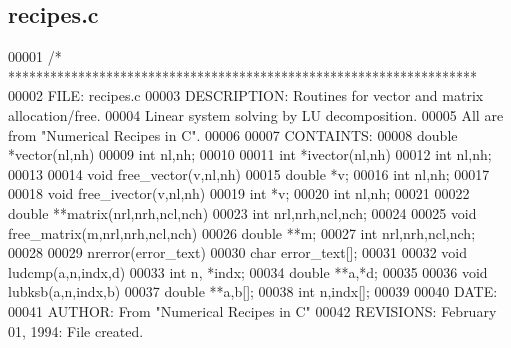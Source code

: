\subsection{recipes.\+c}
\label{recipes_8c_source}

\begin{DoxyCode}
00001 \textcolor{comment}{/* *******************************************************************}
00002 \textcolor{comment}{FILE:       recipes.c}
00003 \textcolor{comment}{DESCRIPTION:    Routines for vector and matrix allocation/free.}
00004 \textcolor{comment}{        Linear system solving by LU decomposition.}
00005 \textcolor{comment}{        All are from "Numerical Recipes in C".}
00006 \textcolor{comment}{}
00007 \textcolor{comment}{CONTAINTS:  }
00008 \textcolor{comment}{        double  *vector(nl,nh)}
00009 \textcolor{comment}{        int    nl,nh;}
00010 \textcolor{comment}{}
00011 \textcolor{comment}{        int  *ivector(nl,nh)}
00012 \textcolor{comment}{        int  nl,nh;}
00013 \textcolor{comment}{}
00014 \textcolor{comment}{        void free\_vector(v,nl,nh)}
00015 \textcolor{comment}{        double *v;}
00016 \textcolor{comment}{        int   nl,nh;}
00017 \textcolor{comment}{}
00018 \textcolor{comment}{        void free\_ivector(v,nl,nh)}
00019 \textcolor{comment}{        int *v;}
00020 \textcolor{comment}{        int   nl,nh;}
00021 \textcolor{comment}{}
00022 \textcolor{comment}{        double  **matrix(nrl,nrh,ncl,nch)}
00023 \textcolor{comment}{        int  nrl,nrh,ncl,nch;}
00024 \textcolor{comment}{}
00025 \textcolor{comment}{        void free\_matrix(m,nrl,nrh,ncl,nch)}
00026 \textcolor{comment}{        double **m;}
00027 \textcolor{comment}{        int   nrl,nrh,ncl,nch;}
00028 \textcolor{comment}{}
00029 \textcolor{comment}{        nrerror(error\_text)}
00030 \textcolor{comment}{        char error\_text[];}
00031 \textcolor{comment}{}
00032 \textcolor{comment}{        void ludcmp(a,n,indx,d)}
00033 \textcolor{comment}{        int n, *indx;}
00034 \textcolor{comment}{        double **a,*d;}
00035 \textcolor{comment}{}
00036 \textcolor{comment}{        void lubksb(a,n,indx,b)}
00037 \textcolor{comment}{        double **a,b[];}
00038 \textcolor{comment}{        int n,indx[];}
00039 \textcolor{comment}{}
00040 \textcolor{comment}{DATE:       }
00041 \textcolor{comment}{AUTHOR:     From "Numerical Recipes in C"}
00042 \textcolor{comment}{REVISIONS:  February 01, 1994: File created.}

\end{DoxyCode}
